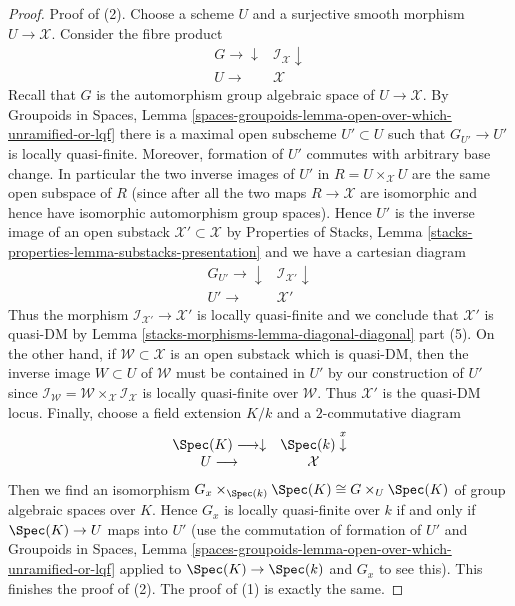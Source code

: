 \begin{proof}
Proof of (2). Choose a scheme $U$ and a surjective smooth morphism
$U \to \mathcal{X}$. Consider the fibre product
$$
\begin{array}{cc}G \longrightarrow\downarrow & \mathcal{I}_\mathcal{X} \downarrow \\ U \longrightarrow & \mathcal{X}\end{array}
$$
Recall that $G$ is the automorphism group algebraic space of
$U \to \mathcal{X}$. By Groupoids in Spaces, Lemma
\ref{spaces-groupoids-lemma-open-over-which-unramified-or-lqf}
there is a maximal open subscheme $U' \subset U$
such that $G_{U'} \to U'$ is locally quasi-finite.
Moreover, formation of $U'$ commutes with arbitrary
base change. In particular the two inverse images of $U'$
in $R = U \times_\mathcal{X} U$ are the same open subspace of $R$
(since after all the two maps $R \to \mathcal{X}$ are isomorphic
and hence have isomorphic automorphism group spaces).
Hence $U'$ is the inverse image of an open substack
$\mathcal{X}' \subset \mathcal{X}$ by
Properties of Stacks, Lemma
\ref{stacks-properties-lemma-substacks-presentation}
and we have a cartesian diagram
$$
\begin{array}{cc}G_{U'} \longrightarrow\downarrow & \mathcal{I}_{\mathcal{X}'} \downarrow \\ U' \longrightarrow & \mathcal{X}'\end{array}
$$
Thus the morphism $\mathcal{I}_{\mathcal{X}'} \to \mathcal{X}'$
is locally quasi-finite and we conclude that
$\mathcal{X}'$ is quasi-DM by Lemma \ref{stacks-morphisms-lemma-diagonal-diagonal}
part (5). On the other hand, if $\mathcal{W} \subset \mathcal{X}$
is an open substack which is quasi-DM, then the inverse image
$W \subset U$ of $\mathcal{W}$ must be contained in $U'$ by our
construction of $U'$ since
$\mathcal{I}_\mathcal{W} =
\mathcal{W} \times_\mathcal{X} \mathcal{I}_\mathcal{X}$
is locally quasi-finite over $\mathcal{W}$.
Thus $\mathcal{X}'$ is the quasi-DM locus.
Finally, choose a field extension $K/k$ and a $2$-commutative
diagram
$$
\begin{array}{cc}\Spec(K) \longrightarrow\downarrow & \Spec(k) \overset{x}{\downarrow} \\ U \longrightarrow & \mathcal{X}\end{array}
$$
Then we find an isomorphism
$G_x \times_{\Spec(k)} \Spec(K) \cong G \times_U \Spec(K)$
of group algebraic spaces over $K$. Hence $G_x$ is locally quasi-finite
over $k$ if and only if $\Spec(K) \to U$ maps into $U'$
(use the commutation of formation of $U'$ and
Groupoids in Spaces, Lemma
\ref{spaces-groupoids-lemma-open-over-which-unramified-or-lqf}
applied to $\Spec(K) \to \Spec(k)$ and $G_x$ to see this).
This finishes the proof of (2). The proof of (1) is
exactly the same.
\end{proof}

